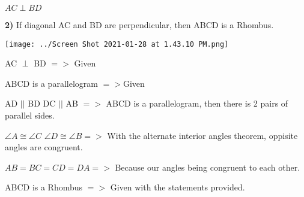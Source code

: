 \documentclass{article}
\begin{document}
 \vspace{2mm}

 
 $AC \perp BD$







\newpage


	\textbf{2)} If diagonal AC and BD are perpendicular, then ABCD is a Rhombus.

\vspace{2mm}


\texttt{[image: ../Screen Shot 2021-01-28 at 1.43.10 PM.png]}

AC $\perp$  BD $=>$ Given

\vspace{2mm}

ABCD is a parallelogram $=>$Given

\vspace{2mm}

AD $||$ BD  DC $||$ AB $= >$ ABCD is a parallelogram, then there is 2 pairs of parallel sides. 

\vspace{2mm}

$\angle{A}  \displaystyle \cong \angle{C}$  $\angle{D}  \displaystyle \cong \angle{B} =>$ With the alternate interior angles theorem, oppisite angles are congruent. 

\vspace{2mm}

$AB=BC=CD=DA =>$ Because our angles being congruent to each other.

\vspace{2mm}

ABCD is a Rhombus $= >$ Given with the statements provided.
\end{document}
